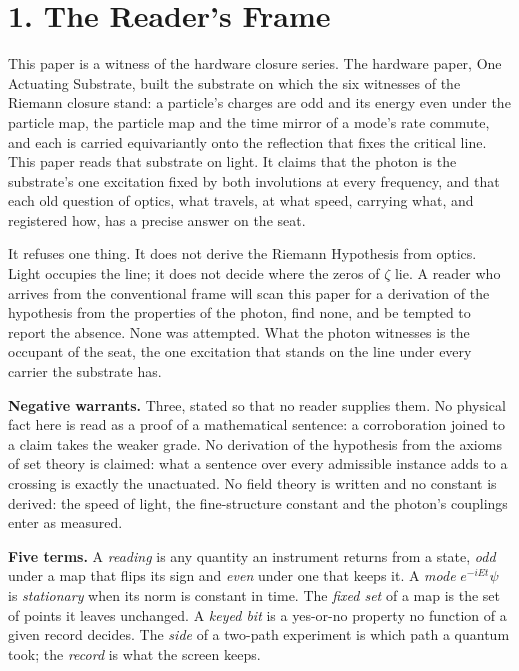 \documentclass[10pt]{article}
\begin{document}
\hypertarget{the-readers-frame}{%
\section{1. The Reader's Frame}\label{the-readers-frame}}

This paper is a witness of the hardware closure series. The hardware
paper, One Actuating Substrate, built the substrate on which the six
witnesses of the Riemann closure stand: a particle's charges are odd and
its energy even under the particle map, the particle map and the time
mirror of a mode's rate commute, and each is carried equivariantly onto
the reflection that fixes the critical line. This paper reads that
substrate on light. It claims that the photon is the substrate's one
excitation fixed by both involutions at every frequency, and that each
old question of optics, what travels, at what speed, carrying what, and
registered how, has a precise answer on the seat.

It refuses one thing. It does not derive the Riemann Hypothesis from
optics. Light occupies the line; it does not decide where the zeros of
\(\zeta\) lie. A reader who arrives from the conventional frame will
scan this paper for a derivation of the hypothesis from the properties
of the photon, find none, and be tempted to report the absence. None was
attempted. What the photon witnesses is the occupant of the seat, the
one excitation that stands on the line under every carrier the substrate
has.

\textbf{Negative warrants.} Three, stated so that no reader supplies
them. No physical fact here is read as a proof of a mathematical
sentence: a corroboration joined to a claim takes the weaker grade. No
derivation of the hypothesis from the axioms of set theory is claimed:
what a sentence over every admissible instance adds to a crossing is
exactly the unactuated. No field theory is written and no constant is
derived: the speed of light, the fine-structure constant and the
photon's couplings enter as measured.

\textbf{Five terms.} A \emph{reading} is any quantity an instrument
returns from a state, \emph{odd} under a map that flips its sign and
\emph{even} under one that keeps it. A \emph{mode} \(e^{-iEt}\psi\) is
\emph{stationary} when its norm is constant in time. The \emph{fixed
set} of a map is the set of points it leaves unchanged. A \emph{keyed
bit} is a yes-or-no property no function of a given record decides. The
\emph{side} of a two-path experiment is which path a quantum took; the
\emph{record} is what the screen keeps.
\end{document}
